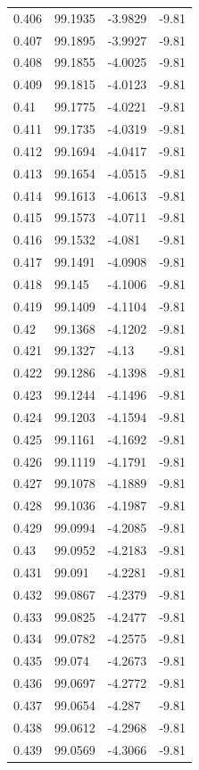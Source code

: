 \begin{tabular}{llll}
0.406 & 99.1935 & -3.9829 & -9.81 \\
0.407 & 99.1895 & -3.9927 & -9.81 \\
0.408 & 99.1855 & -4.0025 & -9.81 \\
0.409 & 99.1815 & -4.0123 & -9.81 \\
0.41 & 99.1775 & -4.0221 & -9.81 \\
0.411 & 99.1735 & -4.0319 & -9.81 \\
0.412 & 99.1694 & -4.0417 & -9.81 \\
0.413 & 99.1654 & -4.0515 & -9.81 \\
0.414 & 99.1613 & -4.0613 & -9.81 \\
0.415 & 99.1573 & -4.0711 & -9.81 \\
0.416 & 99.1532 & -4.081 & -9.81 \\
0.417 & 99.1491 & -4.0908 & -9.81 \\
0.418 & 99.145 & -4.1006 & -9.81 \\
0.419 & 99.1409 & -4.1104 & -9.81 \\
0.42 & 99.1368 & -4.1202 & -9.81 \\
0.421 & 99.1327 & -4.13 & -9.81 \\
0.422 & 99.1286 & -4.1398 & -9.81 \\
0.423 & 99.1244 & -4.1496 & -9.81 \\
0.424 & 99.1203 & -4.1594 & -9.81 \\
0.425 & 99.1161 & -4.1692 & -9.81 \\
0.426 & 99.1119 & -4.1791 & -9.81 \\
0.427 & 99.1078 & -4.1889 & -9.81 \\
0.428 & 99.1036 & -4.1987 & -9.81 \\
0.429 & 99.0994 & -4.2085 & -9.81 \\
0.43 & 99.0952 & -4.2183 & -9.81 \\
0.431 & 99.091 & -4.2281 & -9.81 \\
0.432 & 99.0867 & -4.2379 & -9.81 \\
0.433 & 99.0825 & -4.2477 & -9.81 \\
0.434 & 99.0782 & -4.2575 & -9.81 \\
0.435 & 99.074 & -4.2673 & -9.81 \\
0.436 & 99.0697 & -4.2772 & -9.81 \\
0.437 & 99.0654 & -4.287 & -9.81 \\
0.438 & 99.0612 & -4.2968 & -9.81 \\
0.439 & 99.0569 & -4.3066 & -9.81 \\

\end{tabular}
